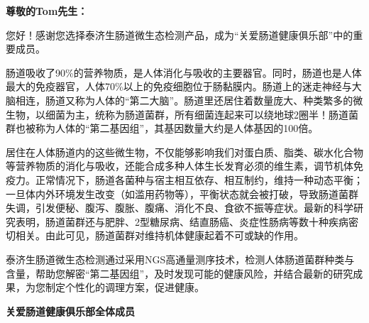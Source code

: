 



\setlength{\arrayrulewidth}{1pt}
\fontsize{9.3pt}{17pt}\selectfont
\color{gray2}

\vspace*{8mm}
{\noindent\bf\sanhao 尊敬的Tom先生：}

\vspace*{6mm}

您好！感谢您选择泰济生肠道微生态检测产品，成为“关爱肠道健康俱乐部”中的重要成员。

肠道吸收了90{\%}的营养物质，是人体消化与吸收的主要器官。同时，肠道也是人体最大的免疫器官，人体70{\%}以上的免疫细胞位于肠黏膜内。肠道上的迷走神经与大脑相连，肠道又称为人体的“第二大脑”。肠道里还居住着数量庞大、种类繁多的微生物，以细菌为主，统称为肠道菌群，所有细菌连起来可以绕地球2圈半！肠道菌群也被称为人体的“第二基因组”，其基因数量大约是人体基因的100倍。

居住在人体肠道内的这些微生物，不仅能够影响我们对蛋白质、脂类、碳水化合物等营养物质的消化与吸收，还能合成多种人体生长发育必须的维生素，调节机体免疫力。正常情况下，肠道各菌种与宿主相互依存、相互制约，维持一种动态平衡；一旦体内外环境发生改变（如滥用药物等），平衡状态就会被打破，导致肠道菌群失调，引发便秘、腹泻、腹胀、腹痛、消化不良、食欲不振等症状。最新的科学研究表明，肠道菌群还与肥胖、2型糖尿病、结直肠癌、炎症性肠病等数十种疾病密切相关。由此可见，肠道菌群对维持机体健康起着不可或缺的作用。

泰济生肠道微生态检测通过采用NGS高通量测序技术，检测人体肠道菌群种类与含量，帮助您解密“第二基因组”，及时发现可能的健康风险，并结合最新的研究成果，为您制定个性化的调理方案，促进健康。

\vspace*{6mm}
\noindent\null\hfill
{\bf\sanhao 关爱肠道健康俱乐部全体成员}



